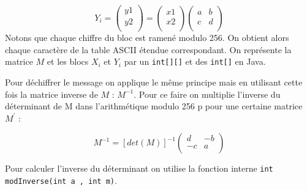 \documentclass{article}
\begin{document}
\[ Y_{i} = \begin{pmatrix}
y1\\
y2\\
\end{pmatrix} = \begin{pmatrix}
x1\\
x2\\
\end{pmatrix} \begin{pmatrix}
a&b\\
c&d\\
\end{pmatrix}  \]
Notons que chaque chiffre du bloc est ramené modulo 256. On obtient alors chaque caractère de la table ASCII étendue correspondant.
On représente la matrice $M$ et les blocs $X_{i}$ et $Y_{i}$ par un \verb+int[][]+ et des \verb+int[]+ en Java. 

Pour déchiffrer le message on applique le même principe mais en utilisant cette fois la matrice inverse de $M$ : $M^{-1}$. Pour ce faire on multiplie l'inverse du déterminant de M dans l'arithmétique modulo 256 p pour une certaine matrice $M^{'}$ : 

\[ M^{-1} = [det(M)]^{-1} \begin{pmatrix}
d&-b\\
-c&a\\
\end{pmatrix} \]

Pour calculer l'inverse du déterminant on utilise la fonction interne \verb+int modInverse(int a , int m)+.
\end{document}
